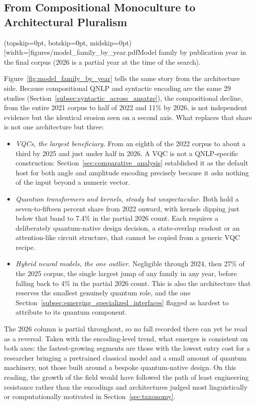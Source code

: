 \documentclass{ieeeaccess}
\begin{document}
\subsection{From Compositional Monoculture to Architectural Pluralism}
\label{subsec:temporal_model_family}

\Figure[t!](topskip=0pt, botskip=0pt, midskip=0pt)[width=\textwidth]{figures/model_family_by_year.pdf}{Model family by publication year in the final corpus (2026 is a partial year at the time of the search).\label{fig:model_family_by_year}}

Figure~\ref{fig:model_family_by_year} tells the same story from the architecture side. Because compositional QNLP and syntactic encoding are the same 29 studies (Section~\ref{subsec:syntactic_across_ansatze}), the compositional decline, from the entire 2021 corpus to half of 2022 and 11\% by 2026, is not independent evidence but the identical erosion seen on a second axis. What replaces that share is not one architecture but three:

\begin{itemize}
\item \emph{VQCs, the largest beneficiary.} From an eighth of the 2022 corpus to about a third by 2025 and just under half in 2026. A VQC is not a QNLP-specific construction: Section~\ref{sec:comparative_analysis} established it as the default host for both angle and amplitude encoding precisely because it asks nothing of the input beyond a numeric vector.

\item \emph{Quantum transformers and kernels, steady but unspectacular.} Both hold a seven-to-fifteen percent share from 2022 onward, with kernels dipping just below that band to 7.4\% in the partial 2026 count. Each requires a deliberately quantum-native design decision, a state-overlap readout or an attention-like circuit structure, that cannot be copied from a generic VQC recipe.

\item \emph{Hybrid neural models, the one outlier.} Negligible through 2024, then 27\% of the 2025 corpus, the single largest jump of any family in any year, before falling back to 4\% in the partial 2026 count. This is also the architecture that reserves the smallest genuinely quantum role, and the one Section~\ref{subsec:emerging_specialized_interfaces} flagged as hardest to attribute to its quantum component.
\end{itemize}

The 2026 column is partial throughout, so no fall recorded there can yet be read as a reversal. Taken with the encoding-level trend, what emerges is consistent on both axes: the fastest-growing segments are those with the lowest entry cost for a researcher bringing a pretrained classical model and a small amount of quantum machinery, not those built around a bespoke quantum-native design. On this reading, the growth of the field would have followed the path of least engineering resistance rather than the encodings and architectures judged most linguistically or computationally motivated in Section~\ref{sec:taxonomy}.
\end{document}
